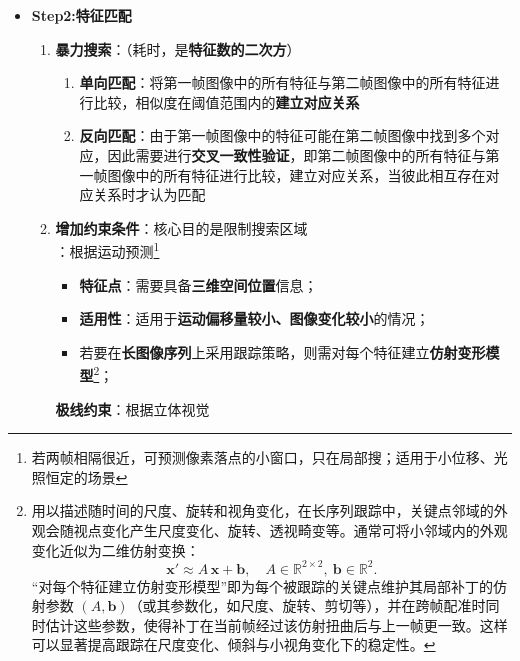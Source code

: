 \documentclass[../main.tex]{subfiles}
\begin{document}
\begin{enumerate}
\begin{itemize}
\begin{enumerate}
\begin{itemize}
                    \item \textbf{Step2:特征匹配}
                        \begin{enumerate}
                            \item \textbf{暴力搜索}：（耗时，是\textbf{特征数的二次方}）
                                \begin{enumerate}
                                    \item \textbf{单向匹配}：将第一帧图像中的所有特征与第二帧图像中的所有特征进行比较，相似度在阈值范围内的\textbf{建立对应关系}
                                    \item \textbf{反向匹配}：由于第一帧图像中的特征可能在第二帧图像中找到多个对应，因此需要进行\textbf{交叉一致性验证}，即第二帧图像中的所有特征与第一帧图像中的所有特征进行比较，建立对应关系，当彼此相互存在对应关系时才认为匹配
                                \end{enumerate}
                            \item \textbf{增加约束条件}：核心目的是限制搜索区域\\
                            \noindent\textbullet{}：根据运动预测\footnote{若两帧相隔很近，可预测像素落点的小窗口，只在局部搜；适用于小位移、光照恒定的场景}
                                \begin{itemize}
                                    \item \textbf{特征点}：需要具备\textbf{三维空间位置}信息；
                                    \item \textbf{适用性}：适用于\textbf{运动偏移量较小、图像变化较小}的情况；
                                    \item 若要在\textbf{长图像序列}上采用跟踪策略，则需对每个特征建立\textbf{仿射变形模型}\footnote{用以描述随时间的尺度、旋转和视角变化，在长序列跟踪中，关键点邻域的外观会随视点变化产生尺度变化、旋转、透视畸变等。通常可将小邻域内的外观变化近似为二维仿射变换：
\[
\mathbf{x}' \approx A\,\mathbf{x} + \mathbf{b},\quad A\in\mathbb{R}^{2\times 2},\ \mathbf{b}\in\mathbb{R}^2.
\]
“对每个特征建立仿射变形模型”即为每个被跟踪的关键点维护其局部补丁的仿射参数 $(A,\mathbf{b})$（或其参数化，如尺度、旋转、剪切等），并在跨帧配准时同时估计这些参数，使得补丁在当前帧经过该仿射扭曲后与上一帧更一致。这样可以显著提高跟踪在尺度变化、倾斜与小视角变化下的稳定性。}；
                                \end{itemize}
                            \noindent\textbullet\quad \textbf{极线约束}：根据立体视觉
                                \begin{itemize}

\end{itemize}
\end{enumerate}
\end{itemize}
\end{enumerate}
\end{itemize}
\end{enumerate}
\end{document}
